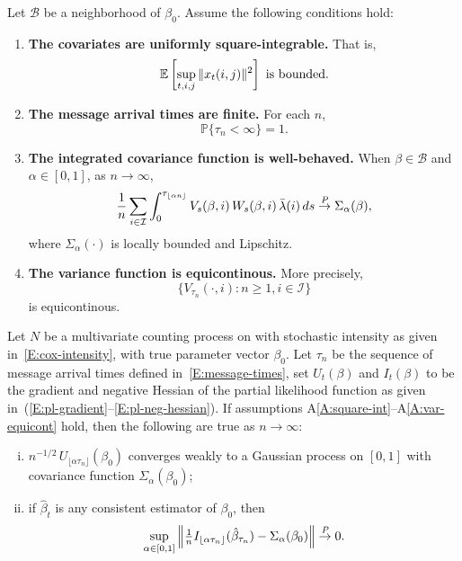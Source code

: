 \documentclass[aoas,preprint]{imsart}
\begin{document}
Let $\mathcal{B}$ be a neighborhood of $\beta_0$.  Assume the following
conditions hold:
\begin{enumerate}[{A}1.]
    \item \label{A:square-int}
    \textbf{The covariates are uniformly square-integrable.}  That is,
    \[
        \mathbb{E}\left[
            \sup_{t, i, j} \| x_{t}(i,j) \|^2
        \right]
        \,\,\text{is bounded.}
    \]
    \item \textbf{The message arrival times are finite.}  For each $n$,
    \[
        \mathbb{P}\{\tau_n < \infty\} = 1.
    \]
    \item \textbf{The integrated covariance function is well-behaved.}
    When $\beta \in \mathcal{B}$ and $\alpha \in [0,1]$, as $ n \to \infty$,
    \[
        \frac{1}{n}
        \sum_{i \in \mathcal{I}}
        \int_0^{\tau_{\lfloor \alpha n \rfloor}}
            V_s(\beta,i)
            \, W_s(\beta,i)
            \, \bar \lambda(i)
            \, ds
        \overset{\mathit{P}}{\to}
        \Sigma_\alpha(\beta),
    \]
    where $\Sigma_\alpha(\cdot)$ is locally bounded and Lipschitz.
    
    \item \label{A:var-equicont}
    \textbf{The variance function is equicontinous.}
    More precisely,
    \[
        \Big\{
            V_{\tau_n}(\cdot, i)
            :
            n \geq 1, i \in \mathcal{I}
        \Big\}
    \]
    is equicontinous.
\end{enumerate}

\begin{theorem}\label{T:score-fisher}
    Let $N$ be a multivariate counting process on with stochastic
    intensity as given in~\eqref{E:cox-intensity}, with true parameter
    vector $\beta_0$.  Let $\tau_n$ be the sequence of message arrival times
    defined in~\eqref{E:message-times}, set $U_t(\beta)$ and $I_t(\beta)$ to
    be the gradient and negative Hessian of the partial likelihood function
    as given in~(\ref{E:pl-gradient}--\ref{E:pl-neg-hessian}).  If assumptions
    A\ref{A:square-int}--A\ref{A:var-equicont} hold, then the following are
    true as $n \to \infty$:
    \begin{enumerate}[(i)]
        \item \label{I:score-part}
        $n^{-1/2} \, U_{\lfloor \alpha \tau_n \rfloor}(\beta_0)$
        converges weakly to a Gaussian process on $[0,1]$ with
        covariance function $\Sigma_\alpha(\beta_0)$;
        
        \item \label{I:fisher-part}
        if $\hat \beta_t$ is any consistent estimator of $\beta_0$,
        then
        \[
            \sup_{\alpha \in [0,1]}
            \left\|
                \tfrac{1}{n}
                I_{\lfloor \alpha \tau_n \rfloor}(\hat \beta_{\tau_n})
                -
                \Sigma_\alpha(\beta_0)
            \right\|
            \overset{\mathit{P}}{\to}
            0.
        \]
    \end{enumerate}
\end{theorem}
\end{document}
